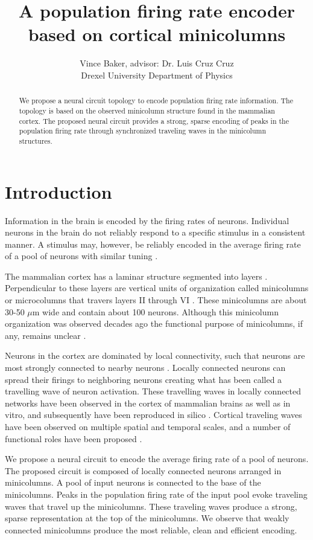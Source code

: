 \documentclass[a4paper,11pt]{article}
\title{A population firing rate encoder based on cortical minicolumns}
\author{Vince Baker, advisor: Dr. Luis Cruz Cruz\\ Drexel University Department of Physics}
\begin{document}
\maketitle

\begin{abstract}
We propose a neural circuit topology to encode population firing rate information.
The topology is based on the observed minicolumn structure found in the mammalian cortex.
The proposed neural circuit provides a strong, sparse encoding of peaks in the population firing rate through synchronized traveling waves in the minicolumn structures.
\end{abstract}

\section{Introduction} 
Information in the brain is encoded by the firing rates of neurons.
Individual neurons in the brain do not reliably respond to a specific stimulus in a consistent manner.
A stimulus may, however, be reliably encoded in the average firing rate of a pool of neurons with similar tuning \cite{trappenberg}.

The mammalian cortex has a laminar structure segmented into layers \cite{banich}.
Perpendicular to these layers are vertical units of organization called minicolumns or microcolumns that travers layers II through VI \cite{buxhoeveden2002}\cite{cruz2005}.
These minicolumns are about 30-50 $\mu$m wide and contain about 100 neurons.
Although this minicolumn organization was observed decades ago the functional purpose of minicolumns, if any, remains unclear \cite{horton2005}.

Neurons in the cortex are dominated by local connectivity, such that neurons are most strongly connected to nearby neurons \cite{levy2012}.
Locally connected neurons can spread their firings to neighboring neurons creating what has been called a travelling wave of neuron activation. 
These travelling waves in locally connected networks have been observed in the cortex of mammalian brains as well as in vitro, and subsequently have been reproduced in silico \cite{keane2015}\cite{ermentrout2001}\cite{wu2008}.
Cortical traveling waves have been observed on multiple spatial and temporal scales, and a number of functional roles have been proposed \cite{muller2018}.

We propose a neural circuit to encode the average firing rate of a pool of neurons.
The proposed circuit is composed of locally connected neurons arranged in minicolumns.
A pool of input neurons is connected to the base of the minicolumns.
Peaks in the population firing rate of the input pool evoke traveling waves that travel up the minicolumns.
These traveling waves produce a strong, sparse representation at the top of the minicolumns.
We observe that weakly connected minicolumns produce the most reliable, clean and efficient encoding.
\end{document}

